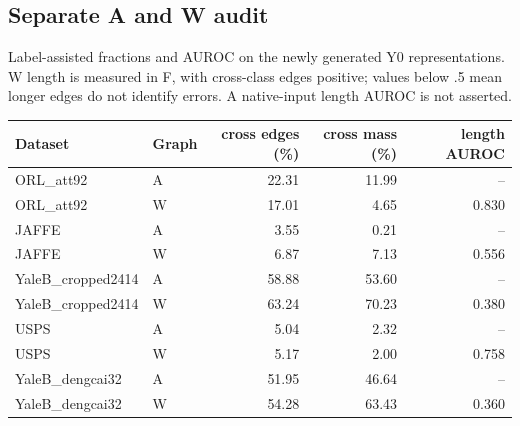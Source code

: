 \subsection{Separate A and W audit}
Label-assisted fractions and AUROC on the newly generated Y0 representations. W length is measured in F, with cross-class edges positive; values below .5 mean longer edges do not identify errors. A native-input length AUROC is not asserted.
\begin{center}\small\begin{tabular}{llrrr}\toprule Dataset & Graph & cross edges (\%) & cross mass (\%) & length AUROC \\\midrule
ORL\_att92 & A & 22.31 & 11.99 & -- \\
ORL\_att92 & W & 17.01 & 4.65 & 0.830 \\
JAFFE & A & 3.55 & 0.21 & -- \\
JAFFE & W & 6.87 & 7.13 & 0.556 \\
YaleB\_cropped2414 & A & 58.88 & 53.60 & -- \\
YaleB\_cropped2414 & W & 63.24 & 70.23 & 0.380 \\
USPS & A & 5.04 & 2.32 & -- \\
USPS & W & 5.17 & 2.00 & 0.758 \\
YaleB\_dengcai32 & A & 51.95 & 46.64 & -- \\
YaleB\_dengcai32 & W & 54.28 & 63.43 & 0.360 \\
\bottomrule\end{tabular}\end{center}
